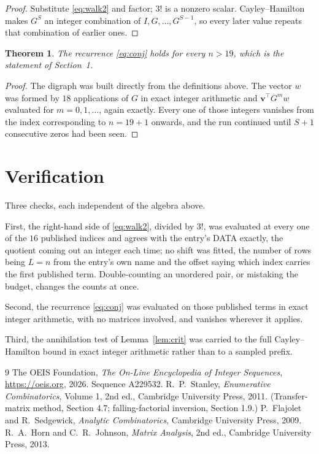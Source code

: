 \documentclass[11pt,a4paper]{article}
\theoremstyle{plain}
\newtheorem{theorem}{Theorem}
\theoremstyle{definition}
\begin{document}
\begin{proof}
Substitute \eqref{eq:walk2} and factor; $3!$ is a nonzero scalar. Cayley--Hamilton
makes $G^{S}$ an integer combination of $I,G,\dots,G^{S-1}$, so every later value repeats
that combination of earlier ones.
\end{proof}

\begin{theorem}
The recurrence \eqref{eq:conj} holds for every $n>19$, which is the statement of
Section~1.
\end{theorem}

\begin{proof}
The digraph was built directly from the definitions above. The vector $w$ was formed by
$18$ applications of $G$ in exact integer arithmetic and $\mathbf{v}^{\!\top}G^{m}w$
evaluated for $m=0,1,\dots$, again exactly. Every one of those integers vanishes from the
index corresponding to $n=19+1$ onwards, and the run continued until $S+1$ consecutive
zeros had been seen.
\end{proof}

\section{Verification}

Three checks, each independent of the algebra above.

First, the right-hand side of \eqref{eq:walk2}, divided by $3!$, was evaluated at every
one of the $16$ published indices and agrees with the entry's DATA exactly, the quotient
coming out an integer each time; no shift was fitted, the number of rows being $L=n$
from the entry's own name and the offset saying which index carries the first published term.
Double-counting an unordered pair, or mistaking the budget, changes the counts at once.

Second, the recurrence \eqref{eq:conj} was evaluated on those published terms in exact
integer arithmetic, with no matrices involved, and vanishes wherever it applies.

Third, the annihilation test of Lemma~\ref{lem:crit} was carried to the full
Cayley--Hamilton bound in exact integer arithmetic rather than to a sampled prefix.

\begin{thebibliography}{9}
 The OEIS Foundation, \emph{The On-Line Encyclopedia of Integer
Sequences}, \url{https://oeis.org}, 2026. Sequence A229532.
 R.~P.~Stanley, \emph{Enumerative Combinatorics}, Volume 1, 2nd ed.,
Cambridge University Press, 2011. (Transfer-matrix method, Section 4.7; falling-factorial
inversion, Section 1.9.)
 P.~Flajolet and R.~Sedgewick, \emph{Analytic Combinatorics}, Cambridge
University Press, 2009.
 R.~A.~Horn and C.~R.~Johnson, \emph{Matrix Analysis}, 2nd ed., Cambridge
University Press, 2013.
\end{thebibliography}
\end{document}
